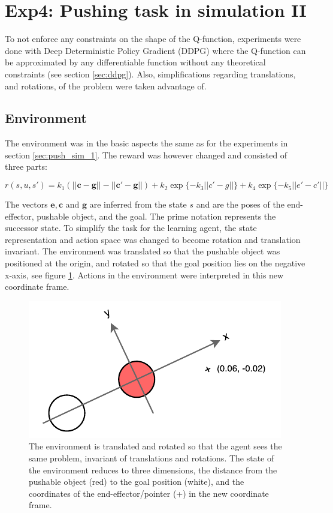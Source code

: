 \section{Exp4: Pushing task in simulation II}

To not enforce any constraints on the shape of the Q-function, experiments were
done with Deep Deterministic Policy Gradient (DDPG) where the Q-function can be
approximated by any differentiable function without any theoretical constraints
(see section \ref{sec:ddpg}). Also, simplifications regarding translations, and
rotations, of the problem were taken advantage of.

\subsection{Environment}

The environment was in the basic aspects the same as for the experiments in
section \ref{sec:push_sim_1}. The reward was however changed and consisted of
three parts:

\begin{equation}
    r(s, u, s') = k_1 \left(\mathbf{||c - g|| - ||c' - g||}\right) + k_2 \exp \lbrace -k_3 ||c' - g|| \rbrace + k_4 \exp \lbrace -k_5||e' - c'||\rbrace
\end{equation}

The vectors $\mathbf{e, c}$ and $\mathbf{g}$ are inferred from the state $s$
and are the poses of the end-effector, pushable object, and the goal. The prime
notation represents the successor state. To simplify the task for the learning
agent, the state representation and action space was changed to become rotation
and translation invariant. The environment was translated so that the pushable
object was positioned at the origin, and rotated so that the goal position lies
on the negative x-axis, see figure \ref{fig:ddpg-coordinates}. Actions in the
environment were interpreted in this new coordinate frame.

\begin{figure}[h!]
    \centering
    \includegraphics[width=0.5 \textwidth]{res/ddpg-coordinates.pdf}

    \caption{The environment is translated and rotated so that the agent sees the same
    problem, invariant of translations and rotations. The state of the environment
    reduces to three dimensions, the distance from the pushable object (red) to the
    goal position (white), and the coordinates of the end-effector/pointer (+) in
    the new coordinate frame.}

    \label{fig:ddpg-coordinates}

\end{figure}


